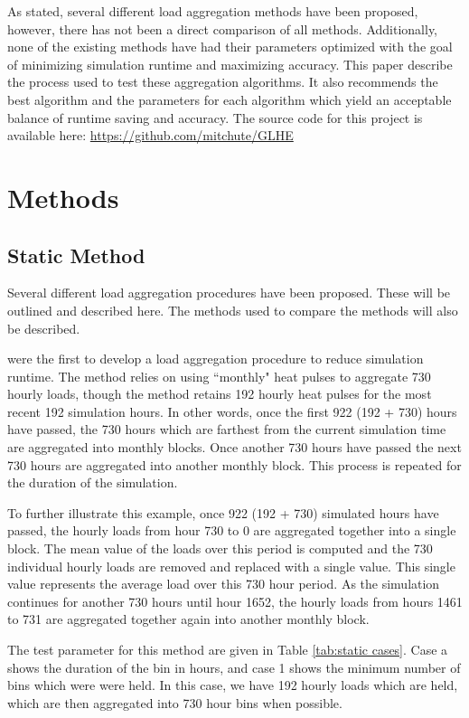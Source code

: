 \documentclass[review,12pt]{elsarticle}
\begin{document}
As stated, several different load aggregation methods have been proposed, however, there has not been a direct comparison of all methods. Additionally, none of the existing methods have had their parameters optimized with the goal of minimizing simulation runtime and maximizing accuracy. This paper describe the process used to test these aggregation algorithms. It also recommends the best algorithm and the parameters for each algorithm which yield an acceptable balance of runtime saving and accuracy. The source code for this project is available here: \url{https://github.com/mitchute/GLHE}

\section*{Methods}

\subsection*{Static Method}

Several different load aggregation procedures have been proposed. These will be outlined and described here. The methods used to compare the methods will also be described.

\cite{YavuzturkSpitler1999} were the first to develop a load aggregation procedure to reduce simulation runtime. The method relies on using ``monthly" heat pulses to aggregate 730 hourly loads, though the method retains 192 hourly heat pulses for the most recent 192 simulation hours. In other words, once the first 922 (192 + 730) hours have passed, the 730 hours which are farthest from the current simulation time are aggregated into monthly blocks. Once another 730 hours have passed the next 730 hours are aggregated into another monthly block. This process is repeated for the duration of the simulation.

To further illustrate this example, once 922 (192 + 730) simulated hours have passed, the hourly loads from hour 730 to 0 are aggregated together into a single block. The mean value of the loads over this period is computed and the 730 individual hourly loads are removed and replaced with a single value. This single value represents the average load over this 730 hour period. As the simulation continues for another 730 hours until hour 1652, the hourly loads from hours 1461 to 731 are aggregated together again into another monthly block.

The test parameter for this method are given in Table \ref{tab:static cases}. Case a shows the duration of the bin in hours, and case 1 shows the minimum number of bins which were were held. In this case, we have 192 hourly loads which are held, which are then aggregated into 730 hour bins when possible.
\end{document}
